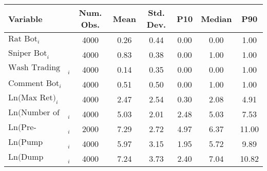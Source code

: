 \begin{tabular}{lcccccc}
\hline
Variable & Num. Obs. & Mean & Std. Dev. & P10 & Median & P90 \\
\hline
$\text{Rat Bot}_{i}$ & 4000 & 0.26 & 0.44 & 0.00 & 0.00 & 1.00 \\
$\text{Sniper Bot}_{i}$ & 4000 & 0.83 & 0.38 & 0.00 & 1.00 & 1.00 \\
$\text{Wash Trading Bot}_{i}$ & 4000 & 0.14 & 0.35 & 0.00 & 0.00 & 1.00 \\
$\text{Comment Bot}_{i}$ & 4000 & 0.51 & 0.50 & 0.00 & 1.00 & 1.00 \\
$\text{Ln(Max Ret)}_{i}$ & 4000 & 2.47 & 2.54 & 0.30 & 2.08 & 4.91 \\
$\text{Ln(Number of Traders)}_{i}$ & 4000 & 5.03 & 2.01 & 2.48 & 5.03 & 7.53 \\
$\text{Ln(Pre-Migration Duration)}_{i}$ & 2000 & 7.29 & 2.72 & 4.97 & 6.37 & 11.00 \\
$\text{Ln(Pump Duration)}_{i}$ & 4000 & 5.97 & 3.15 & 1.95 & 5.72 & 9.89 \\
$\text{Ln(Dump Duration)}_{i}$ & 4000 & 7.24 & 3.73 & 2.40 & 7.04 & 10.82 \\
\hline
\end{tabular}